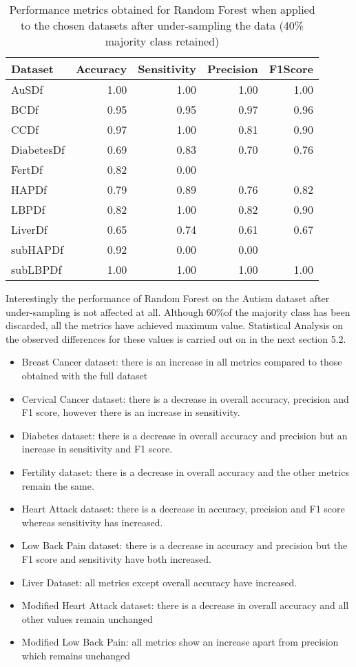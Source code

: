 \begin{table}[ht]
\centering
\begin{tabular}{lrrrr}
  \hline
  \rowcolor{LightCyan}
Dataset & Accuracy & Sensitivity & Precision & F1Score \\ 
  \hline
AuSDf & 1.00 & 1.00 & 1.00 & 1.00 \\ 
  BCDf & 0.95 & 0.95 & 0.97 & 0.96 \\ 
  CCDf & 0.97 & 1.00 & 0.81 & 0.90 \\ 
  DiabetesDf & 0.69 & 0.83 & 0.70 & 0.76 \\ 
  FertDf & 0.82 & 0.00 &  &  \\ 
  HAPDf & 0.79 & 0.89 & 0.76 & 0.82 \\ 
  LBPDf & 0.82 & 1.00 & 0.82 & 0.90 \\ 
  LiverDf & 0.65 & 0.74 & 0.61 & 0.67 \\ 
  subHAPDf & 0.92 & 0.00 & 0.00 &  \\ 
  subLBPDf & 1.00 & 1.00 & 1.00 & 1.00 \\ 
   \hline
\end{tabular}
\caption{Performance metrics obtained for Random Forest when applied to the chosen datasets after under-sampling the data (40\% majority class retained)}
\end{table}

Interestingly the performance of Random Forest on the Autism dataset after under-sampling is not affected at all. Although 60\%of the majority class has been discarded, all the metrics have achieved maximum value.
Statistical Analysis on the observed differences for these values is carried out on in the next section 5.2.
\begin{itemize}
    \item Breast Cancer dataset: there is an increase in all metrics compared to those obtained with the full dataset 
    \item Cervical Cancer dataset: there is a decrease in overall accuracy, precision and F1 score, however there is an increase in sensitivity.
    \item Diabetes dataset: there is a decrease in overall accuracy and precision but an increase in sensitivity and F1 score.
    \item Fertility dataset: there is a decrease in overall accuracy and the other metrics remain the same.
    \item Heart Attack dataset: there is a decrease in accuracy, precision and F1 score whereas sensitivity has increased.
    \item Low Back Pain dataset: there is a decrease in accuracy and precision but the F1 score and sensitivity have both increased.
    \item Liver Dataset: all metrics except overall accuracy have increased.
    \item Modified Heart Attack dataset: there is a decrease in overall accuracy and all other values remain unchanged
    \item Modified Low Back Pain: all metrics show an increase apart from precision which remains unchanged
\end{itemize}

